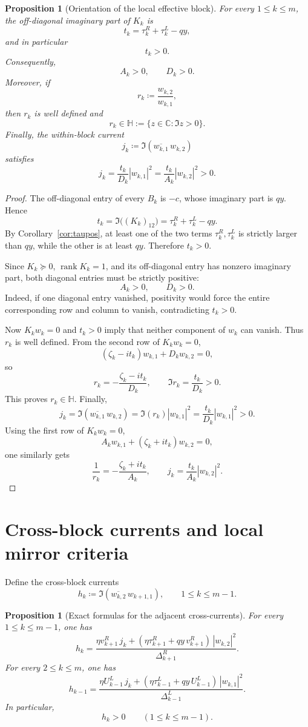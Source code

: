 \documentclass[11pt]{article}
\newtheorem{proposition}[theorem]{Proposition}
\newcommand{\C}{\mathbb C}
\newcommand{\HH}{\mathbb H}
\begin{document}
\begin{proposition}[Orientation of the local effective block]\label{prop:orientation}
For every \(1\le k\le m\), the off-diagonal imaginary part of \(K_k\) is
\[
t_k=\tau_k^R+\tau_k^L-qy,
\]
and in particular
\[
t_k>0.
\]
Consequently,
\[
A_k>0,
\qquad
D_k>0.
\]
Moreover, if
\[
r_k\coloneqq \frac{w_{k,2}}{w_{k,1}},
\]
then \(r_k\) is well defined and
\[
r_k\in\HH:=\{z\in\C:\Im z>0\}.
\]
Finally, the within-block current
\[
j_k\coloneqq \Im(\overline{w_{k,1}}\,w_{k,2})
\]
satisfies
\[
j_k=\frac{t_k}{D_k}|w_{k,1}|^2=\frac{t_k}{A_k}|w_{k,2}|^2>0.
\]
\end{proposition}

\begin{proof}
The off-diagonal entry of every \(B_k\) is \(-c\), whose imaginary part is \(qy\). Hence
\[
t_k=\Im\bigl((K_k)_{12}\bigr)=\tau_k^R+\tau_k^L-qy.
\]
By Corollary~\ref{cor:taupos}, at least one of the two terms \(\tau_k^R,\tau_k^L\) is strictly
larger than \(qy\), while the other is at least \(qy\). Therefore \(t_k>0\).

Since \(K_k\succeq 0\), \(\operatorname{rank}K_k=1\), and its off-diagonal entry has nonzero
imaginary part, both diagonal entries must be strictly positive:
\[
A_k>0,\qquad D_k>0.
\]
Indeed, if one diagonal entry vanished, positivity would force the entire corresponding row and
column to vanish, contradicting \(t_k>0\).

Now \(K_k w_k=0\) and \(t_k>0\) imply that neither component of \(w_k\) can vanish. Thus
\(r_k\) is well defined. From the second row of \(K_k w_k=0\),
\[
(\zeta_k-i t_k)w_{k,1}+D_k w_{k,2}=0,
\]
so
\[
r_k=-\frac{\zeta_k-i t_k}{D_k},
\qquad
\Im r_k=\frac{t_k}{D_k}>0.
\]
This proves \(r_k\in\HH\). Finally,
\[
j_k=\Im(\overline{w_{k,1}}\,w_{k,2})
=\Im(r_k)|w_{k,1}|^2
=\frac{t_k}{D_k}|w_{k,1}|^2>0.
\]
Using the first row of \(K_k w_k=0\),
\[
A_k w_{k,1}+(\zeta_k+i t_k)w_{k,2}=0,
\]
one similarly gets
\[
\frac{1}{r_k}=-\frac{\zeta_k+i t_k}{A_k},
\qquad
j_k=\frac{t_k}{A_k}|w_{k,2}|^2.
\]
\end{proof}

\section{Cross-block currents and local mirror criteria}

Define the cross-block currents
\[
h_k\coloneqq \Im(\overline{w_{k,2}}\,w_{k+1,1}),
\qquad
1\le k\le m-1.
\]

\begin{proposition}[Exact formulas for the adjacent cross-currents]\label{prop:h}
For every \(1\le k\le m-1\), one has
\[
h_k
=
\frac{
\eta v_{k+1}^R\,j_k
+
(\eta\tau_{k+1}^R+qy\,v_{k+1}^R)\,|w_{k,2}|^2
}{
\Delta_{k+1}^R
}.
\]
For every \(2\le k\le m\), one has
\[
h_{k-1}
=
\frac{
\eta U_{k-1}^L\,j_k
+
(\eta\tau_{k-1}^L+qy\,U_{k-1}^L)\,|w_{k,1}|^2
}{
\Delta_{k-1}^L
}.
\]
In particular,
\[
h_k>0
\qquad
(1\le k\le m-1).
\]
\end{proposition}
\end{document}
